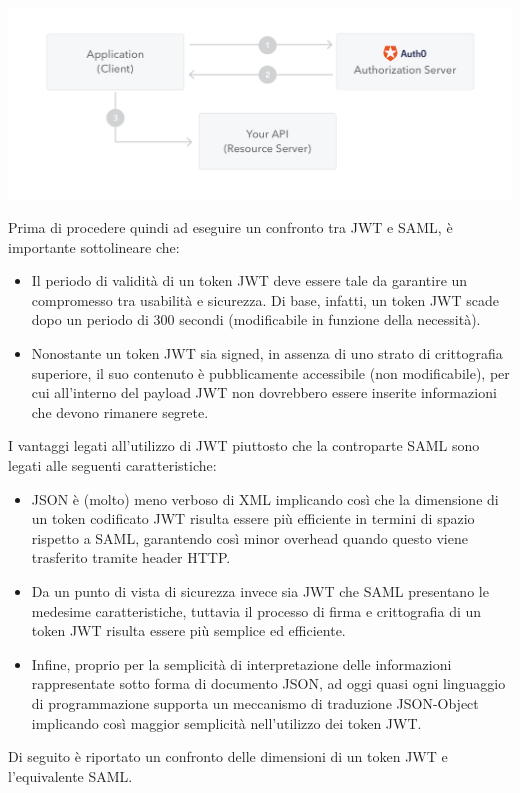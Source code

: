 \documentclass[twoside]{report}
\begin{document}
\begin{center}
\begin{minipage}{0.7\linewidth}
    \vspace{2mm}
    \centering
    \includegraphics[width= \linewidth]{2.png}
    \vspace{2mm}
\end{minipage}

\end{center}

Prima di procedere quindi ad eseguire un confronto tra JWT e SAML, è importante sottolineare che:

\begin{itemize}
    \item Il periodo di validità di un token JWT deve essere tale da garantire un compromesso tra usabilità e sicurezza. Di base, infatti, un token JWT scade dopo un periodo di 300 secondi (modificabile in funzione della necessità).
    \item Nonostante un token JWT sia signed, in assenza di uno strato di crittografia superiore, il suo contenuto è pubblicamente accessibile (non modificabile), per cui all'interno del payload JWT non dovrebbero essere inserite informazioni che devono rimanere segrete.
\end{itemize}

I vantaggi legati all'utilizzo di JWT piuttosto che la controparte SAML sono legati alle seguenti caratteristiche:

\begin{itemize}
    \item JSON è (molto) meno verboso di XML implicando così che la dimensione di un token codificato JWT risulta essere più efficiente in termini di spazio rispetto a SAML, garantendo così minor overhead quando questo viene trasferito tramite header HTTP.
    \item Da un punto di vista di sicurezza invece sia JWT che SAML presentano le medesime caratteristiche, tuttavia il processo di firma e crittografia di un token JWT risulta essere più semplice ed efficiente.
    \item Infine, proprio per la semplicità di interpretazione delle informazioni rappresentate sotto forma di documento JSON, ad oggi quasi ogni linguaggio di programmazione supporta un meccanismo di traduzione JSON-Object implicando così maggior semplicità nell'utilizzo dei token JWT.
\end{itemize}
\newpage
Di seguito è riportato un confronto delle dimensioni di un token JWT e l'equivalente SAML.
\end{document}
